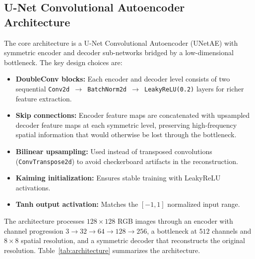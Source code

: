 \documentclass{article}
\begin{document}
\subsection{U-Net Convolutional Autoencoder Architecture}

The core architecture is a U-Net Convolutional Autoencoder (UNetAE) with symmetric encoder and decoder sub-networks bridged by a low-dimensional bottleneck. The key design choices are:

\begin{itemize}
    \item \textbf{DoubleConv blocks:} Each encoder and decoder level consists of two sequential \texttt{Conv2d $\rightarrow$ BatchNorm2d $\rightarrow$ LeakyReLU(0.2)} layers for richer feature extraction.
    \item \textbf{Skip connections:} Encoder feature maps are concatenated with upsampled decoder feature maps at each symmetric level, preserving high-frequency spatial information that would otherwise be lost through the bottleneck.
    \item \textbf{Bilinear upsampling:} Used instead of transposed convolutions (\texttt{ConvTranspose2d}) to avoid checkerboard artifacts in the reconstruction.
    \item \textbf{Kaiming initialization:} Ensures stable training with LeakyReLU activations.
    \item \textbf{Tanh output activation:} Matches the $[-1, 1]$ normalized input range.
\end{itemize}

The architecture processes $128 \times 128$ RGB images through an encoder with channel progression $3 \rightarrow 32 \rightarrow 64 \rightarrow 128 \rightarrow 256$, a bottleneck at $512$ channels and $8 \times 8$ spatial resolution, and a symmetric decoder that reconstructs the original resolution. Table~\ref{tab:architecture} summarizes the architecture.
\end{document}
